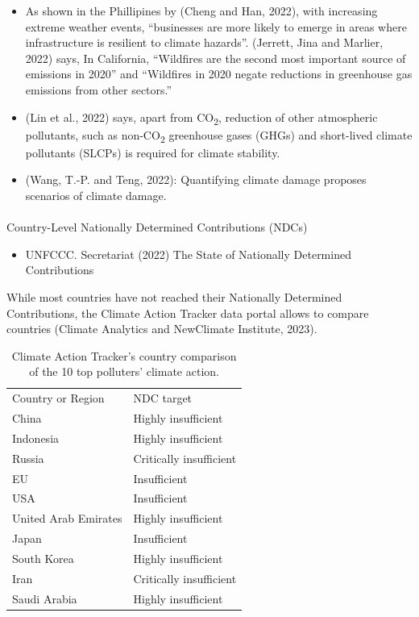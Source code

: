 \documentclass[
  letterpaper,
  DIV=11,
  numbers=noendperiod]{scrartcl}
\makeatletter
\let\oldparagraph\paragraph
\renewcommand{\paragraph}{
    \@ifstar
      \xxxParagraphStar
      \xxxParagraphNoStar
  }
\newcommand{\xxxParagraphStar}[1]{\oldparagraph*{#1}\mbox{}}
\newcommand{\xxxParagraphNoStar}[1]{\oldparagraph{#1}\mbox{}}
\providecommand{\tightlist}{%
  \setlength{\itemsep}{0pt}\setlength{\parskip}{0pt}}\usepackage{longtable,booktabs,array}
\makeatother
\begin{document}
\begin{itemize}
\item
  As shown in the Phillipines by (Cheng and Han, 2022), with increasing
  extreme weather events, ``businesses are more likely to emerge in
  areas where infrastructure is resilient to climate hazards''.
  (Jerrett, Jina and Marlier, 2022) says, In California, ``Wildfires are
  the second most important source of emissions in 2020'' and
  ``Wildfires in 2020 negate reductions in greenhouse gas emissions from
  other sectors.''
\item
  (Lin et al., 2022) says, apart from CO\textsubscript{2}, reduction of
  other atmospheric pollutants, such as non-CO\textsubscript{2}
  greenhouse gases (GHGs) and short-lived climate pollutants (SLCPs) is
  required for climate stability.
\item
  (Wang, T.-P. and Teng, 2022): Quantifying climate damage proposes
  scenarios of climate damage.
\end{itemize}

\paragraph{Country-Level Nationally Determined Contributions
(NDCs)}\label{country-level-nationally-determined-contributions-ndcs}

\begin{itemize}
\tightlist
\item
  UNFCCC. Secretariat (2022) The State of Nationally Determined
  Contributions
\end{itemize}

While most countries have not reached their Nationally Determined
Contributions, the Climate Action Tracker data portal allows to compare
countries (Climate Analytics and NewClimate Institute, 2023).

\begin{longtable}[]{@{}ll@{}}
\caption{Climate Action Tracker's country comparison of the 10 top
polluters' climate action.}\tabularnewline
\toprule\noalign{}
\endfirsthead
\endhead
\bottomrule\noalign{}
\endlastfoot
Country or Region & NDC target \\
China & Highly insufficient \\
Indonesia & Highly insufficient \\
Russia & Critically insufficient \\
EU & Insufficient \\
USA & Insufficient \\
United Arab Emirates & Highly insufficient \\
Japan & Insufficient \\
South Korea & Highly insufficient \\
Iran & Critically insufficient \\
Saudi Arabia & Highly insufficient \\
\end{longtable}
\end{document}

